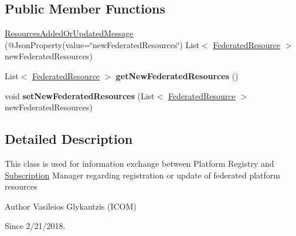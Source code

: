 \subsection*{Public Member Functions}
\begin{DoxyCompactItemize}
\item 
\hyperlink{classeu_1_1h2020_1_1symbiote_1_1cloud_1_1model_1_1internal_1_1ResourcesAddedOrUpdatedMessage_a7e8e6484fe05dae2457383048e2ba851}{Resources\+Added\+Or\+Updated\+Message} (@Json\+Property(value=\char`\"{}new\+Federated\+Resources\char`\"{}) List$<$ \hyperlink{classeu_1_1h2020_1_1symbiote_1_1cloud_1_1model_1_1internal_1_1FederatedResource}{Federated\+Resource} $>$ new\+Federated\+Resources)
\item 
\mbox{\label{classeu_1_1h2020_1_1symbiote_1_1cloud_1_1model_1_1internal_1_1ResourcesAddedOrUpdatedMessage_ac92d05deea726b6728ba8e27c0293e73}} 
List$<$ \hyperlink{classeu_1_1h2020_1_1symbiote_1_1cloud_1_1model_1_1internal_1_1FederatedResource}{Federated\+Resource} $>$ {\bfseries get\+New\+Federated\+Resources} ()
\item 
\mbox{\label{classeu_1_1h2020_1_1symbiote_1_1cloud_1_1model_1_1internal_1_1ResourcesAddedOrUpdatedMessage_ab95054692c20f5b4f3dc6448693a4df7}} 
void {\bfseries set\+New\+Federated\+Resources} (List$<$ \hyperlink{classeu_1_1h2020_1_1symbiote_1_1cloud_1_1model_1_1internal_1_1FederatedResource}{Federated\+Resource} $>$ new\+Federated\+Resources)
\end{DoxyCompactItemize}


\subsection{Detailed Description}
This class is used for information exchange between Platform Registry and \hyperlink{classeu_1_1h2020_1_1symbiote_1_1cloud_1_1model_1_1internal_1_1Subscription}{Subscription} Manager regarding registration or update of federated platform resources

\begin{DoxyAuthor}{Author}
Vasileios Glykantzis (I\+C\+OM) 
\end{DoxyAuthor}
\begin{DoxySince}{Since}
2/21/2018. 
\end{DoxySince}


